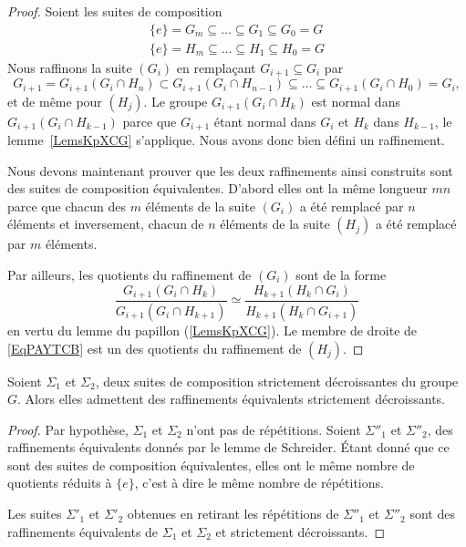 \begin{proof}
    Soient les suites de composition
    \begin{subequations}
        \begin{align}
            \{ e \}=G_m\subseteq\ldots\subseteq G_1\subseteq G_0=G\\
            \{ e \}=H_m\subseteq\ldots\subseteq H_1\subseteq H_0=G
        \end{align}
    \end{subequations}
    Nous raffinons la suite \( (G_i)\) en remplaçant \( G_{i+1}\subseteq G_i\) par
    \begin{equation}
        G_{i+1}=G_{i+1}(G_i\cap H_n)\subset G_{i+1}(G_i\cap H_{n-1})\subseteq\ldots\subseteq G_{i+1}(G_i\cap H_0)=G_i,
    \end{equation}
    et de même pour \( (H_j)\). Le groupe \( G_{i+1}(G_i\cap H_k)\) est normal dans \( G_{i+1}(G_i\cap H_{k-1})\) parce que \( G_{i+1}\) étant normal dans \( G_i\) et \( H_k\) dans \( H_{k-1}\), le lemme~\ref{LemsKpXCG} s'applique. Nous avons donc bien défini un raffinement.

    Nous devons maintenant prouver que les deux raffinements ainsi construits sont des suites de composition équivalentes. D'abord elles ont la même longueur \( mn\) parce que chacun des \( m\) éléments de la suite \( (G_i)\) a été remplacé par \( n\) éléments et inversement, chacun de \( n\) éléments de la suite \( (H_j)\) a été remplacé par \( m\) éléments.

    Par ailleurs, les quotients du raffinement de \( (G_i)\) sont de la forme
    \begin{equation}    \label{EqPAYTCB}
        \frac{ G_{i+1}(G_i \cap H_k) }{ G_{i+1}(G_i\cap H_{k+1}) }\simeq \frac{ H_{k+1}(H_k\cap G_i) }{ H_{k+1}(H_k\cap G_{i+1}) }
    \end{equation}
    en vertu du lemme du papillon (\ref{LemsKpXCG}). Le membre de droite de \eqref{EqPAYTCB} est un des quotients du raffinement de \( (H_j)\).
\end{proof}

\begin{lemma}    \label{LemBSicRJ}
    Soient \( \Sigma_1\) et \( \Sigma_2\), deux suites de composition strictement décroissantes du groupe \( G\). Alors elles admettent des raffinements équivalents strictement décroissants.
\end{lemma}

\begin{proof}
    Par hypothèse, \( \Sigma_1\) et \( \Sigma_2\) n'ont pas de répétitions. Soient \( \Sigma''_1\) et \( \Sigma''_2\), des raffinements équivalents donnés par le lemme de Schreider. Étant donné que ce sont des suites de composition équivalentes, elles ont le même nombre de quotients réduits à \( \{ e \}\), c'est à dire le même nombre de répétitions.

    Les suites \( \Sigma'_1\) et \( \Sigma'_2\) obtenues en retirant les répétitions de \( \Sigma''_1\) et \( \Sigma''_2\) sont des raffinements équivalents de \( \Sigma_1\) et \( \Sigma_2\) et strictement décroissants.
\end{proof}

